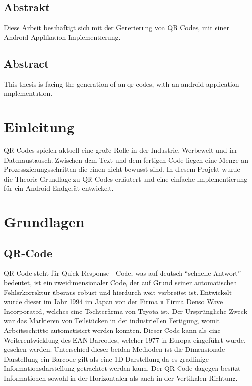 \documentclass[12pt,					%
							 oneside,			%
							 a4paper,			%
							 halfparskip,		%
							 liststotoc,			%
							 bibtotoc,			%
							 fleqn,				%
							 pointlessnumbers]	%
							 {scrreprt}
\begin{document}
	\onehalfspacing 					%
	

	
\section*{Abstrakt}
Diese Arbeit beschäftigt sich mit der Generierung von QR Codes, mit einer Android Applikation Implementierung.
\section*{Abstract}
This thesis is facing the generation of an qr codes, with an android application implementation.
\tableofcontents
{} 					%

\chapter{Einleitung}
QR-Codes spielen aktuell eine große Rolle in der Industrie, Werbewelt und im Datenaustausch. Zwischen dem Text und dem fertigen Code liegen eine Menge an Prozesszierungsschritten die einen nicht bewusst sind.
In diesem Projekt wurde die Theorie Grundlage zu QR-Codes erläutert und eine einfache Implementierung für ein Android Endgerät entwickelt.

\chapter{Grundlagen}
\section{QR-Code}
QR-Code steht für Quick Response - Code, was auf deutsch ``schnelle Antwort'' bedeutet, ist ein zweidimensionaler Code, der auf Grund seiner automatischen Fehlerkorrektur überaus robust und hierdurch weit verbreitet ist. 
Entwickelt wurde dieser im Jahr 1994 im Japan von der Firma n Firma Denso Wave Incorporated, welches eine Tochterfirma von Toyota ist. Der Ursprüngliche Zweck war das Markieren von Teilstücken in der industriellen Fertigung, womit Arbeitsschritte automatisiert werden konnten. Dieser Code kann als eine Weiterentwicklung des EAN-Barcodes, welcher 1977 in Europa eingeführt wurde, gesehen werden. Unterschied dieser beiden Methoden ist die Dimensionale Darstellung ein Barcode gilt als eine 1D Darstellung da es gradlinige Informationsdarstellung getrachtet werden kann. Der QR-Code dagegen besitzt Informationen sowohl in der Horizontalen als auch in der Vertikalen Richtung.
\end{document}
